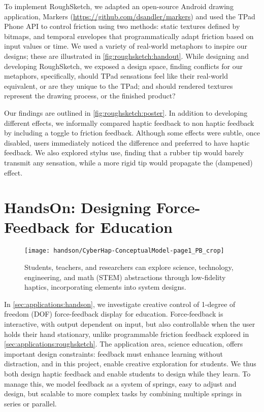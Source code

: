 \noindent
To implement RoughSketch, we adapted an open-source Android drawing application, Markers (\url{https://github.com/dsandler/markers}) and used the TPad Phone API to control friction using two methods:
static textures defined by bitmaps, and
temporal envelopes that programmatically adapt friction based on input values or time.
We used a variety of real-world metaphors to inspire our designs; these are
illustrated in \autoref{fig:roughsketch:handout}.
While designing and developing RoughSketch, we exposed a design space, finding conflicts for our metaphors, specifically, should TPad sensations feel like their real-world equivalent, or are they unique to the TPad; and 
should rendered textures represent the drawing process, or the finished product?

Our findings are outlined in \autoref{fig:roughsketch:poster}.
In addition to developing different effects, we informally compared haptic feedback to non haptic feedback by including a toggle to friction feedback.
Although some effects were subtle, once disabled, users immediately noticed the difference and preferred to have haptic feedback.
We also explored stylus use, finding that a rubber tip would barely transmit any sensation, while a more rigid tip would propagate the (dampened) effect.




\section{HandsOn: Designing Force-Feedback for Education}
\label{sec:applications:handson}

\begin{figure} [bt]
  \centering
  \texttt{[image: handson/CyberHap-ConceptualModel-page1\_PB\_crop]}
  \caption{Students, teachers, and researchers can explore science, technology, engineering, and math (STEM) abstractions through low-fidelity haptics, incorporating elements into system designs.}
  \label{fig:conceptOverview}
\end{figure}

In \autoref{sec:applications:handson}, we investigate creative control of 1-degree of freedom (DOF) force-feedback display for education.
Force-feedback is interactive, with output dependent on input, but also controllable when the user holds their hand stationary, unlike programmable friction feedback explored in \autoref{sec:applications:roughsketch}.
The application area, science education, offers important design constraints: feedback must enhance learning without distraction, and in this project, enable creative exploration for students.
We thus both design haptic feedback and enable students to design while they learn.
To manage this, we model feedback as a system of springs, easy to adjust and design, but scalable to more complex tasks by combining multiple springs in series or parallel.


